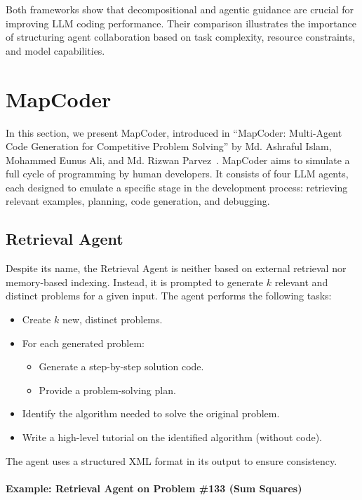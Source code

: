 \documentclass[11pt,a4paper]{article}
\begin{document}
Both frameworks show that decompositional and agentic guidance are crucial for improving LLM coding performance. Their comparison illustrates the importance of structuring agent collaboration based on task complexity, resource constraints, and model capabilities.

\section{MapCoder}

In this section, we present MapCoder, introduced in ``MapCoder: Multi-Agent Code Generation for Competitive Problem Solving'' by Md. Ashraful Islam, Mohammed Eunus Ali, and Md. Rizwan Parvez~\cite{islam2024mapcodermultiagentcodegeneration}. MapCoder aims to simulate a full cycle of programming by human developers. It consists of four LLM agents, each designed to emulate a specific stage in the development process: retrieving relevant examples, planning, code generation, and debugging.

\subsection{Retrieval Agent}
Despite its name, the Retrieval Agent is neither based on external retrieval nor memory-based indexing. Instead, it is prompted to generate $k$ relevant and distinct problems for a given input. The agent performs the following tasks:

\begin{itemize}
  \item Create $k$ new, distinct problems.
  \item For each generated problem:
  \begin{itemize}
    \item Generate a step-by-step solution code.
    \item Provide a problem-solving plan.
  \end{itemize}
  \item Identify the algorithm needed to solve the original problem.
  \item Write a high-level tutorial on the identified algorithm (without code).
\end{itemize}

The agent uses a structured XML format in its output to ensure consistency.

\paragraph{Example: Retrieval Agent on Problem \#133 (Sum Squares)}
\end{document}
